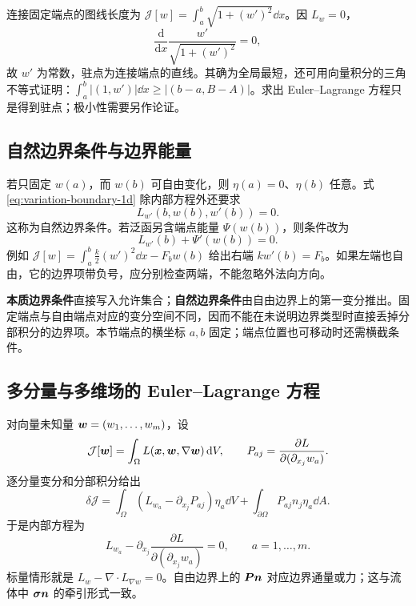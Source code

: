 \begin{example}[最短图线与驻点的几何意义]
连接固定端点的图线长度为 $\mathcal J[w]=\int_a^b\sqrt{1+(w')^2}\dd x$。因 $L_w=0$，
\begin{equation}
 \frac{\mathrm d}{\mathrm dx}\frac{w'}{\sqrt{1+(w')^2}}=0,
\end{equation}
故 $w'$ 为常数，驻点为连接端点的直线。其确为全局最短，还可用向量积分的三角不等式证明：$\int_a^b|(1,w')|\dd x\ge|(b-a,B-A)|$。求出 Euler--Lagrange 方程只是得到驻点；极小性需要另作论证。
\end{example}

\subsection{自然边界条件与边界能量}

若只固定 $w(a)$，而 $w(b)$ 可自由变化，则 $\eta(a)=0$、$\eta(b)$ 任意。式 \eqref{eq:variation-boundary-1d} 除内部方程外还要求
\begin{equation}
 L_{w'}(b,w(b),w'(b))=0.
\end{equation}
这称为自然边界条件。若泛函另含端点能量 $\Psi(w(b))$，则条件改为
\begin{equation}
 L_{w'}(b)+\Psi'(w(b))=0.
\end{equation}
例如 $\mathcal J[w]=\int_a^b\frac{k}{2}(w')^2\dd x-F_bw(b)$ 给出右端 $kw'(b)=F_b$。如果左端也自由，它的边界项带负号，应分别检查两端，不能忽略外法向方向。

\begin{keypoint}
\textbf{本质边界条件}直接写入允许集合；\textbf{自然边界条件}由自由边界上的第一变分推出。固定端点与自由端点对应的变分空间不同，因而不能在未说明边界类型时直接丢掉分部积分的边界项。本节端点的横坐标 $a,b$ 固定；端点位置也可移动时还需横截条件。
\end{keypoint}

\subsection{多分量与多维场的 Euler--Lagrange 方程}

对向量未知量 $\bm{w}=(w_1,\ldots,w_m)$，设
\begin{equation}
 \mathcal J[\bm{w}]=\int_\Omega L(\bm{x},\bm{w},\nabla\bm{w})\,\mathrm d V,
 \qquad P_{aj}=\frac{\partial L}{\partial(\partial_{x_j}w_a)}.
\end{equation}
逐分量变分和分部积分给出
\begin{equation}
 \delta\mathcal J
 =\int_\Omega(L_{w_a}-\partial_{x_j}P_{aj})\eta_a\dd V
 +\int_{\partial\Omega}P_{aj}n_j\eta_a\dd A.
\end{equation}
于是内部方程为
\begin{equation}
 \boxed{L_{w_a}-\partial_{x_j}
 \frac{\partial L}{\partial(\partial_{x_j}w_a)}=0,
 \qquad a=1,\ldots,m.}\label{eq:el-field}
\end{equation}
标量情形就是 $L_w-\nabla\cdot L_{\nabla w}=0$。自由边界上的 $\bm{P}\bm{n}$ 对应边界通量或力；这与流体中 $\bm{\sigma}\bm{n}$ 的牵引形式一致。

